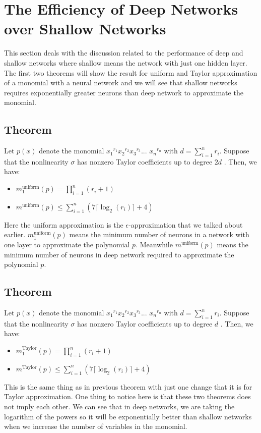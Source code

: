 \documentclass{article}
\begin{document}
\section{The Efficiency of Deep Networks over Shallow Networks}
This section deals with the discussion related to the performance of deep and shallow networks where shallow means the network with just one hidden layer. The first two theorems will show the result for uniform and Taylor approximation of a monomial with a neural network and we will see that shallow networks requires exponentially greater neurons than deep network to approximate the monomial.
\subsection{Theorem}
Let $p(x)$ denote the monomial ${x_1}^{r_1} {x_2}^{r_2} {x_3}^{r_3} ...$ ${x_n}^{r_n}$ with $d=\sum\limits_{i=1}^n r_i$. Suppose that the nonlinearity $\sigma$ has nonzero Taylor coefficients up to degree $2d$ \cite{paper1}. Then, we have:
    \begin{itemize}
        \item $m_1^{\text{uniform}} (p) = \prod\limits_{i=1}^n (r_i + 1)$
        \item $m^{\text{uniform}} (p) \leq \sum\limits_{i=1}^n (7 \lceil \log_2 (r_i) \rceil + 4)$ 
    \end{itemize}
Here the uniform approximation is the $\epsilon$-approximation that we talked about earlier. $m_1^{\text{uniform}}(p)$ means the minimum number of neurons in a network with one layer to approximate the polynomial $p$. Meanwhile $m^{\text{uniform}} (p)$ means the minimum number of neurons in deep network required to approximate the polynomial $p$.
\subsection{Theorem}
Let $p(x)$ denote the monomial ${x_1}^{r_1} {x_2}^{r_2} {x_3}^{r_3} ...$ ${x_n}^{r_n}$ with $d=\sum\limits_{i=1}^n r_i$. Suppose that the nonlinearity $\sigma$ has nonzero Taylor coefficients up to degree $d$ \cite{paper1}. Then, we have:
    \begin{itemize}
        \item $m_1^{\text{Taylor}} (p) = \prod\limits_{i=1}^n (r_i + 1)$
        \item $m^{\text{Taylor}} (p) \leq \sum\limits_{i=1}^n (7 \lceil \log_2 (r_i) \rceil + 4)$
    \end{itemize}

This is the same thing as in previous theorem with just one change that it is for Taylor approximation. One thing to notice here is that these two theorems does not imply each other. We can see that in deep networks, we are taking the logarithm of the powers so it will be exponentially better than shallow networks when we increase the number of variables in the monomial. 
\end{document}
